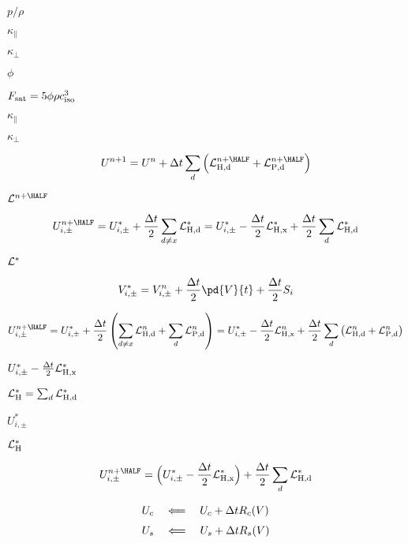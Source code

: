 \documentclass{article}
\begin{document}
$p/\rho$
\pagebreak

$ 
\kappa_\| $
\pagebreak

$ \kappa_\bot $
\pagebreak

$ \phi $
\pagebreak

$ F_{\rm sat} = 5\phi\rho c_{\rm iso}^3 $
\pagebreak

$ \kappa_\parallel $
\pagebreak

$ \kappa_\perp $
\pagebreak

\[
   U^{n+1} = U^{n} + \Delta t\sum_d\Big({\cal L}^{n+\HALF}_{\rm H,d}
                                      + {\cal L}^{n+\HALF}_{\rm P,d}\Big)
\]
\pagebreak

${\cal L}^{n+\HALF}$
\pagebreak

\[
   U^{n+\HALF}_{i,\pm} = U^*_{i,\pm} + \frac{\Delta t}{2}\sum_{d \neq x}{\cal L}^*_{\rm H,d}
                       = U^*_{i,\pm} - \frac{\Delta t}{2}{\cal L}^*_{\rm H,x} +
                        \frac{\Delta t}{2}\sum_d {\cal L}^*_{\rm H,d}
\]
\pagebreak

${\cal L}^*$
\pagebreak

\[
    V^{*}_{i,\pm} = V^n_{i,\pm} + \frac{\Delta t}{2}\pd{V}{t}
                                + \frac{\Delta t}{2}S_i
\]
\pagebreak

\[
   U^{n+\HALF}_{i,\pm} = U^*_{i,\pm} + \frac{\Delta t}{2}\left(
                         \sum_{d\neq x}{\cal L}^n_{\rm H,d}
                        + \sum_{d}{\cal L}^n_{\rm P,d}\right)
                       = U^*_{i,\pm} - \frac{\Delta t}{2}{\cal L}^n_{\rm H,x} +
                         \frac{\Delta t}{2}\sum_d\left( {\cal L}^n_{\rm H,d}
                         + {\cal L}^n_{\rm P,d}\right)
\]
\pagebreak

$ U^*_{i,\pm} - \frac{\Delta t}{2}{\cal L}^*_{\rm H,x} $
\pagebreak

${\cal L}^*_{\rm H} = \sum_d{\cal L}^*_{\rm H,d}$
\pagebreak

$U^*_{i,\pm}$
\pagebreak

${\cal L}^*_{\rm H}$
\pagebreak

\[
        U^{n+\HALF}_{i,\pm} =
          \Big(U^*_{i,\pm} - \frac{\Delta t}{2}{\cal L}^*_{\rm H,x}\Big)
         + \frac{\Delta t}{2}\sum_d {\cal L}^*_{\rm H,d}
    \]
\pagebreak

\[
   \begin{array}{l}
    U_c \quad\Longleftarrow \quad  U_c + \Delta t R_c(V) \\ \noalign{\medskip}
    U_s \quad\Longleftarrow \quad  U_s + \Delta t R_s(V)
   \end{array}
\]
\pagebreak
\end{document}
